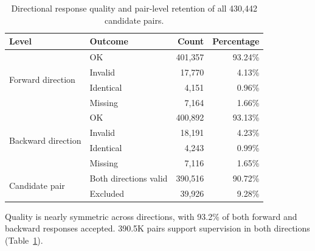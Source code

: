 \begin{table}[t]
\centering
\caption{Directional response quality and pair-level retention of all 430,442 candidate pairs.}
\label{tab:daeditikz_retention}
\setlength{\tabcolsep}{7pt}
\renewcommand{\arraystretch}{0.98}
\begin{tabular}{llrr}
\toprule
\textbf{Level} & \textbf{Outcome} & \textbf{Count} & \textbf{Percentage} \\
\midrule
\multirow{4}{*}{Forward direction}
 & OK        & 401,357 & 93.24\% \\
 & Invalid   &  17,770 &  4.13\% \\
 & Identical &   4,151 &  0.96\% \\
 & Missing   &   7,164 &  1.66\% \\
\midrule
\multirow{4}{*}{Backward direction}
 & OK        & 400,892 & 93.13\% \\
 & Invalid   &  18,191 &  4.23\% \\
 & Identical &   4,243 &  0.99\% \\
 & Missing   &   7,116 &  1.65\% \\
\midrule
\multirow{2}{*}{Candidate pair}
 & Both directions valid  & 390,516 & 90.72\% \\
 & Excluded      &  39,926 &  9.28\% \\
\bottomrule
\end{tabular}
\end{table}
Quality is nearly symmetric across directions, with 93.2\% of both forward and backward responses accepted. 390.5K pairs support supervision in both directions (Table~\ref{tab:daeditikz_retention}).

\clearpage

